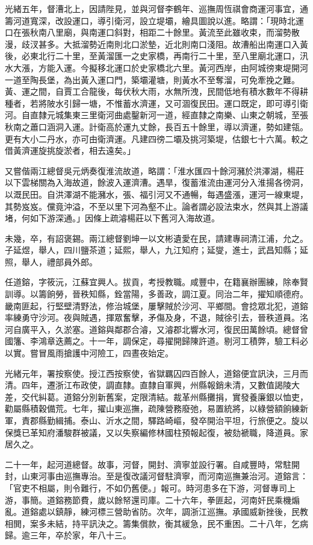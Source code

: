 \begin{pinyinscope}
光緒五年，督漕北上，因請陛見，並與河督李鶴年、巡撫周恆祺會商運河事宜，通籌河道寬深，改設運口，導引衛河，設立堤壩，繪具圖說以進。略謂：「現時北運口在張秋南八里廟，與南運口斜對，相距二十餘里。黃流至此雖收束，而溜勢散漫，歧汊甚多。大抵溜勢近南則北口淤墊，近北則南口淺阻。故漕船出南運口入黃後，必東北行二十里，至黃溜匯一之史家橋，再南行二十里，至八里廟北運口，汛水大漲，方能入運。今擬移北運口於史家橋北六里。黃河西岸，由阿城徬東堤開河一道至陶長堡，為出黃入運口門，築壩灌塘，則黃水不至奪溜，可免牽挽之難。黃、運之間，自賈工合龍後，每伏秋大雨，水無所洩，民間低地有積水數年不得耕種者，若將陂水引歸一塘，不惟蓄水濟運，又可涸復民田。運口既定，即可導引衛河。自直隸元城集東三里衛河曲處鑿新河一道，經直隸之南樂、山東之朝城，至張秋南之蕭口涵洞入運。計衛高於運九丈餘，長百五十餘里，導以濟運，勢如建瓴。更有大小二丹水，亦可由衛濟運。凡建四徬二壩及挑河築堤，估銀七十六萬。較之借黃濟運旋挑旋淤者，相去遠矣。」

又嘗偕兩江總督吳元炳奏復淮流故道，略謂：「淮水匯四十餘河瀦於洪澤湖，楊莊以下雲梯關為入海故道，餘波入運濟漕。遇旱，復蓄淮流由運河分入淮揚各徬洞，以溉民田。自洪澤湖不能瀦水，張、福引河又不通暢，每遇盛漲，運河一線東堤，其勢岌岌。儻竟沖溢，不至以里下河為壑不止。論者謂必設法束水，然與其上游議堵，何如下游深通。」因條上疏濬楊莊以下舊河入海故道。

未幾，卒，有詔褒錫。兩江總督劉坤一以文彬遺愛在民，請建專祠清江浦，允之。子延煜，舉人，四川鹽茶道；延熙，舉人，九江知府；延燮，進士，武昌知縣；延照，舉人，禮部員外郎。

任道鎔，字筱沅，江蘇宜興人。拔貢，考授教職。咸豐中，在籍襄辦團練，除奉賢訓導。以籌餉勞，晉秩知縣，銓當陽，多善政，調江夏。同治二年，擢知順德府。畿南匪起，行堅壁清野法，修治城堡，屢擊賊於沙河、平鄉間。會捻眾北犯，道鎔率練勇守沙河。夜與賊遇，揮眾奮擊，矛傷及身，不退，賊徐引去，晉秩道員。洺河自廣平入，久淤塞。道鎔與鄰郡合濬，又濬郡北響水河，復民田萬餘頃。總督曾國籓、李鴻章迭薦之。十一年，調保定，尋擢開歸陳許道。剔河工積弊，驗工料必以實。嘗冒風雨搶護中河險工，四晝夜始定。

光緒元年，署按察使。授江西按察使，省獄羈囚四百餘人，道鎔便宜訊決，三月而清。四年，遷浙江布政使，調直隸。直隸自軍興，州縣報銷未清，又數值謁陵大差，交代糾葛。道鎔分別新舊案，定限清結。裁革州縣攤捐，實發養廉銀以恤吏，勸屬縣積穀備荒。七年，擢山東巡撫，疏陳營務廢弛，易置統將，以綠營額餉練新軍，責郡縣勤緝捕。泰山、沂水之間，驛路崎嶇，發卒開治平坦，行旅便之。旋以保獎已革知府潘駿群被議，又以失察編修林國柱預報起復，被劾褫職，降道員。家居久之。

二十一年，起河道總督。故事，河督，開封、濟寧並設行署。自咸豐時，常駐開封，山東河事由巡撫專治。至是復改議河督駐濟寧，而河南巡撫兼治河。道鎔言：「官吏不相屬，則令難行，不如仍舊便。」報可。時河患多在下游，河督專司上游，事簡。道鎔務節費，歲以餘帑還司庫。二十六年，拳匪起，河南奸民乘機煽亂。道鎔處以鎮靜，練河標三營助省防。次年，調浙江巡撫。承國威新挫後，民教相閧，案多未結，持平訊決之。籌集償款，衡其緩急，民不重困。二十八年，乞病歸。逾三年，卒於家，年八十三。


\end{pinyinscope}
